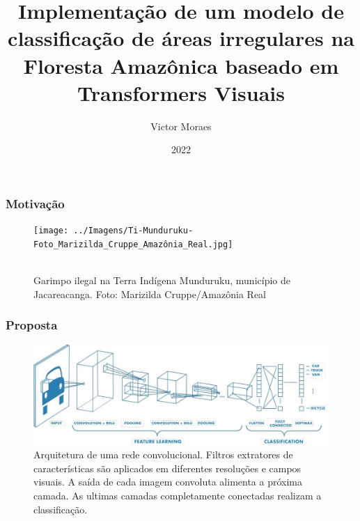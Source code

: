 \documentclass{beamer}
\title{Implementação de um modelo de classificação de áreas irregulares na Floresta Amazônica baseado em Transformers Visuais}
\author{Victor Moraes}
\institute{UFMG}
\date{2022}
\begin{document}
\frame{\titlepage}

\begin{frame}
\frametitle{Motivação}

    \begin{figure}[!h]
    \centering
    \texttt{[image: ../Imagens/Ti-Munduruku-Foto\_Marizilda\_Cruppe\_Amazônia\_Real.jpg]}
    \caption[width=0.2\columnwidth]{\\\small Garimpo ilegal na Terra Indígena Munduruku, município de Jacareacanga. Foto: Marizilda Cruppe/Amazônia Real}
    \label{fig:garimpo2}
    \end{figure}


\end{frame}

\begin{frame}
\frametitle{Proposta}
    \begin{figure}[!ht]
        \centering
        \includegraphics[width=0.95\columnwidth]{
            ../Imagens/CNN_mathworks.jpg
        }
        \caption{Arquitetura de uma rede convolucional. Filtros extratores de características são aplicados em diferentes resoluções e campos visuais. A saída de cada imagem convoluta alimenta a próxima camada. As ultimas camadas completamente conectadas realizam a classificação.}
        \label{fig:cnn}
    \end{figure}
\end{frame}
\end{document}
